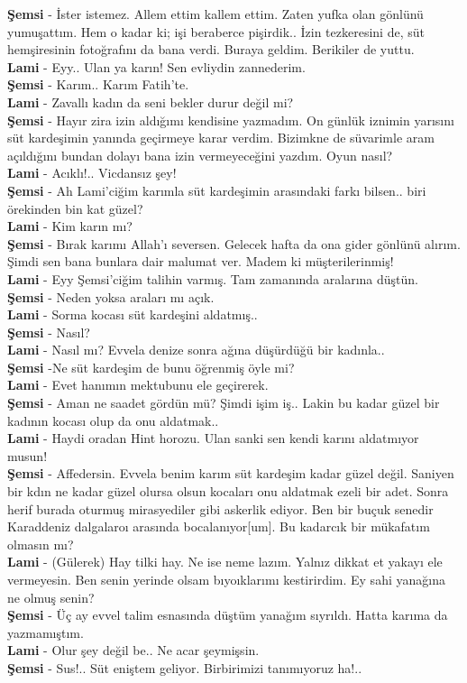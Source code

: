 \documentclass[]{book}
\begin{document}
\textbf{Şemsi} - İster istemez. Allem ettim kallem ettim. Zaten yufka olan gönlünü yumuşattım. Hem o kadar ki; işi beraberce pişirdik.. İzin tezkeresini de, süt hemşiresinin fotoğrafını da bana verdi. Buraya geldim. Berikiler de yuttu.\\
\textbf{Lami} - Eyy.. Ulan ya karın! Sen evliydin zannederim.\\
\textbf{Şemsi} - Karım.. Karım Fatih'te.\\
\textbf{Lami} - Zavallı kadın da seni bekler durur değil mi?\\
\textbf{Şemsi} - Hayır zira izin aldığımı kendisine yazmadım. On günlük iznimin yarısını süt kardeşimin yanında geçirmeye karar verdim. Bizimkne de süvarimle aram açıldığını bundan dolayı bana izin vermeyeceğini yazdım. Oyun nasıl?\\
\textbf{Lami} - Acıklı!.. Vicdansız şey!\\
\textbf{Şemsi} - Ah Lami'ciğim karımla süt kardeşimin arasındaki farkı bilsen.. biri örekinden bin kat güzel?\\
\textbf{Lami} - Kim karın mı?\\
\textbf{Şemsi} - Bırak karımı Allah'ı seversen. Gelecek hafta da ona gider gönlünü alırım. Şimdi sen bana bunlara dair malumat ver. Madem ki müşterilerinmiş!\\
\textbf{Lami} - Eyy Şemsi'ciğim talihin varmış. Tam zamanında aralarına düştün.\\
\textbf{Şemsi} - Neden yoksa araları mı açık.\\
\textbf{Lami} - Sorma kocası süt kardeşini aldatmış..\\
\textbf{Şemsi} - Nasıl?\\
\textbf{Lami} - Nasıl mı? Evvela denize sonra ağına düşürdüğü bir kadınla..\\
\textbf{Şemsi} -Ne süt kardeşim de bunu öğrenmiş öyle mi?\\
\textbf{Lami} - Evet hanımın mektubunu ele geçirerek.\\
\textbf{Şemsi} - Aman ne saadet gördün mü? Şimdi işim iş.. Lakin bu kadar güzel bir kadının kocası olup da onu aldatmak..\\
\textbf{Lami} - Haydi oradan Hint horozu. Ulan sanki sen kendi karını aldatmıyor musun!\\
\textbf{Şemsi} - Affedersin. Evvela benim karım süt kardeşim kadar güzel değil. Saniyen bir kdın ne kadar güzel olursa olsun kocaları onu aldatmak ezeli bir adet. Sonra herif burada oturmuş mirasyediler gibi askerlik ediyor. Ben bir buçuk senedir Karaddeniz dalgalaroı arasında bocalanıyor{[}um{]}. Bu kadarcık bir mükafatım olmasın mı?\\
\textbf{Lami} - (Gülerek) Hay tilki hay. Ne ise neme lazım. Yalnız dikkat et yakayı ele vermeyesin. Ben senin yerinde olsam bıyoıklarımı kestirirdim. Ey sahi yanağına ne olmuş senin?\\
\textbf{Şemsi} - Üç ay evvel talim esnasında düştüm yanağım sıyrıldı. Hatta karıma da yazmamıştım.\\
\textbf{Lami} - Olur şey değil be.. Ne acar şeymişsin.\\
\textbf{Şemsi} - Sus!.. Süt eniştem geliyor. Birbirimizi tanımıyoruz ha!..\\
\end{document}
